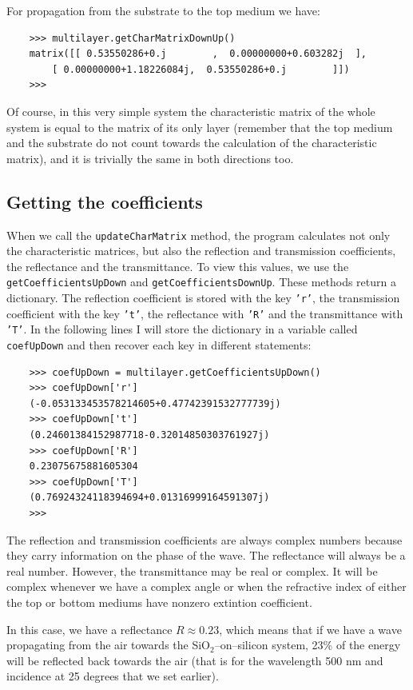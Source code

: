 \documentclass[a4paper,11pt,aps,final]{revtex4}
\begin{document}
For propagation from the substrate to the top medium we have:
\begin{verbatim}
    >>> multilayer.getCharMatrixDownUp()
    matrix([[ 0.53550286+0.j        ,  0.00000000+0.603282j  ],
        [ 0.00000000+1.18226084j,  0.53550286+0.j        ]])
    >>>
\end{verbatim}

Of course, in this very simple system the characteristic matrix of the whole system is equal to the matrix of its only layer (remember that the top medium and the substrate do not count towards the calculation of the characteristic matrix), and it is trivially the same in both directions too.

\subsection{Getting the coefficients}
When we call the \texttt{updateCharMatrix} method, the program calculates not only the characteristic matrices, but also the reflection and transmission coefficients, the reflectance and the transmittance. To view this values, we use the \texttt{getCoefficientsUpDown} and \texttt{getCoefficientsDownUp}. These methods return a dictionary. The reflection coefficient is stored with the key \texttt{'r'}, the transmission coefficient with the key \texttt{'t'}, the reflectance with \texttt{'R'} and the transmittance with \texttt{'T'}. In the following lines I will store the dictionary in a variable called \texttt{coefUpDown} and then recover each key in different statements:
\begin{verbatim}
    >>> coefUpDown = multilayer.getCoefficientsUpDown()
    >>> coefUpDown['r']
    (-0.053133453578214605+0.47742391532777739j)
    >>> coefUpDown['t']
    (0.24601384152987718-0.32014850303761927j)
    >>> coefUpDown['R']
    0.23075675881605304
    >>> coefUpDown['T']
    (0.76924324118394694+0.01316999164591307j)
    >>>
\end{verbatim}

The reflection and transmission coefficients are always complex numbers because they carry information on the phase of the wave. The reflectance will always be a real number. However, the transmittance may be real or complex. It will be complex whenever we have a complex angle or when the refractive index of either the top or bottom mediums have nonzero extintion coefficient.

In this case, we have a reflectance $R \approx 0.23$, which means that if we have a wave propagating from the air towards the SiO$_2$--on--silicon system, 23\% of the energy will be reflected back towards the air (that is for the wavelength 500 nm and incidence at 25 degrees that we set earlier).
\end{document}
